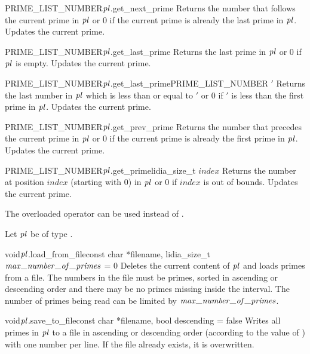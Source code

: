 \begin{cfcode}{PRIME_LIST_NUMBER}{$\mathit{pl}$.get_next_prime}{}
  Returns the number that follows the current prime in $\mathit{pl}$ or 0 if the current prime is already
  the last prime in $\mathit{pl}$.  Updates the current prime.
\end{cfcode}

\begin{cfcode}{PRIME_LIST_NUMBER}{$\mathit{pl}$.get_last_prime}{}
  Returns the last prime in $\mathit{pl}$ or 0 if $\mathit{pl}$ is empty.  Updates the current prime.
\end{cfcode}

\begin{cfcode}{PRIME_LIST_NUMBER}{$\mathit{pl}$.get_last_prime}{PRIME_LIST_NUMBER $\prime$}
  Returns the last number in $\mathit{pl}$ which is less than or equal to $\prime$ or 0 if $\prime$ is
  less than the first prime in $\mathit{pl}$.  Updates the current prime.
\end{cfcode}

\begin{cfcode}{PRIME_LIST_NUMBER}{$\mathit{pl}$.get_prev_prime}{}
  Returns the number that precedes the current prime in $\mathit{pl}$ or 0 if the current prime is
  already the first prime in $\mathit{pl}$.  Updates the current prime.
\end{cfcode}

\begin{cfcode}{PRIME_LIST_NUMBER}{$\mathit{pl}$.get_prime}{lidia_size_t $\mathit{index}$}
  Returns the number at position $\mathit{index}$ (starting with 0) in $\mathit{pl}$ or 0 if
  $\mathit{index}$ is out of bounds.  Updates the current prime.
\end{cfcode}

The overloaded operator \code{[]} can be used instead of .



\IO

Let $\mathit{pl}$ be of type .

\begin{fcode}{void}{$\mathit{pl}$.load_from_file}{const char *filename, lidia_size_t $\maxnumberofprimes$ = 0}
  Deletes the current content of $\mathit{pl}$ and loads primes from a file.  The numbers in the file
  must be primes, sorted in ascending or descending order and there may be no primes missing
  inside the interval.  The number of primes being read can be limited by $\maxnumberofprimes$.
\end{fcode}

\begin{cfcode}{void}{$\mathit{pl}$.save_to_file}{const char *filename, bool descending = false}
  Writes all primes in $\mathit{pl}$ to a file in ascending or descending order (according to the value
  of ) with one number per line.  If the file already exists, it is
  overwritten.
\end{cfcode}


